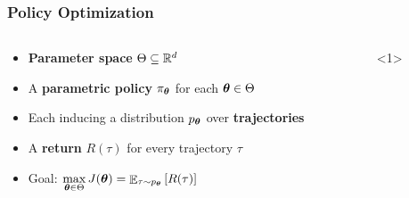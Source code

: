 \documentclass[aspectratio=169, table]{beamer}
\newcommand{\enb}[1]{\textcolor{poliblue1}{\textbf{#1}}}
\begin{document}
\begin{frame}
\frametitle{Policy Optimization} 
\begin{columns}
\begin{column}{.65\textwidth}
\begin{overlayarea}{\textwidth}{\textheight}
\begin{itemize}
	\setlength{\itemsep}{20pt}
	\item \enb{Parameter space} $\Theta \subseteq \mathbb{R}^d$
	\item<2-> A \enb{parametric policy} $\pi_{\boldsymbol{\theta}}$ for each $\boldsymbol{\theta}\in\Theta$
	\item<3-> Each inducing a distribution $p_{\boldsymbol{\theta}}$ over \enb{trajectories}
	\item<4-> A \enb{return} $R(\tau)$ for every trajectory $\tau$
	\item<5-> {Goal: $\max\limits_{\boldsymbol{\theta}\in\Theta} J(\boldsymbol{\theta}) = \mathop{\mathbb{E}}_{\tau\sim p_{\boldsymbol{\theta}}}\left[R(\tau)\right]$}
\end{itemize}
\end{overlayarea}
\end{column}
\begin{column}{.35\textwidth}
\begin{overlayarea}{\textwidth}{\textheight}
	\only{
}
\end{overlayarea}
\end{column}
\end{columns}
\end{frame}
\end{document}
